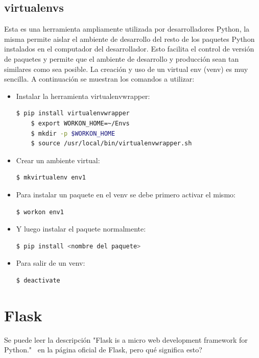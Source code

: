 \subsection{virtualenvs}

Esta es una herramienta ampliamente utilizada por desarrolladores Python, la misma permite aislar el ambiente de desarrollo del resto de los paquetes Python instalados en el computador del desarrollador. Esto facilita el control de versión de paquetes y permite que el ambiente de desarrollo y producción sean tan similares como sea posible. 
La creación y uso de un virtual env (venv) es muy sencilla. A continuación se muestran los comandos a utilizar:

\begin{itemize}
\item Instalar la herramienta virtualenvwrapper:
\begin{lstlisting}[language=bash]
  	$ pip install virtualenvwrapper
	$ export WORKON_HOME=~/Envs
	$ mkdir -p $WORKON_HOME
	$ source /usr/local/bin/virtualenvwrapper.sh
\end{lstlisting}	

\item Crear un ambiente virtual:
\begin{lstlisting}[language=bash]
  $ mkvirtualenv env1
\end{lstlisting}
	
\item Para instalar un paquete en el venv se debe primero activar el mismo:
\begin{lstlisting}[language=bash]
  $ workon env1
\end{lstlisting}
	
\item Y luego instalar el paquete normalmente:
\begin{lstlisting}[language=bash]
  $ pip install <nombre del paquete>
\end{lstlisting}

\item Para salir de un venv:
\begin{lstlisting}[language=bash]
  $ deactivate
\end{lstlisting}

\end{itemize}

\section{Flask}
Se puede leer la descripción "Flask is a micro web development framework for Python."~\cite{FlaskDocs} en la página oficial de Flask, pero qué significa esto?

